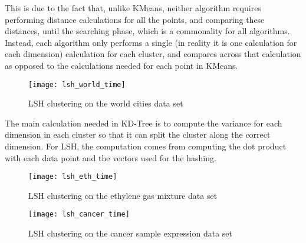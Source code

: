 \documentclass[journal]{IEEEtran}
\begin{document}
This is due to the fact that, unlike KMeans, neither algorithm requires performing distance calculations for all the points, and comparing these distances, until the searching phase, which is a commonality for all algorithms. Instead, each algorithm only performs a single (in reality it is one calculation for each dimension) calculation for each cluster, and compares across that calculation as opposed to the calculations needed for each point in KMeans.  

\begin{figure}[h]
	\texttt{[image: lsh\_world\_time]}
	\caption{LSH clustering on the world cities data set}
\end{figure}

The main calculation needed in KD-Tree is to compute the variance for each dimension in each cluster so that  it can split the cluster along the correct dimension. For LSH, the computation comes from computing the dot product with each data point and the vectors used for the hashing. \par

\begin{figure}[h]
	\texttt{[image: lsh\_eth\_time]}
	\caption{LSH clustering on the ethylene gas mixture data set}
\end{figure}
\begin{figure}[h]
	\texttt{[image: lsh\_cancer\_time]}
	\caption{LSH clustering on the cancer sample expression data set}
\end{figure}
\end{document}

